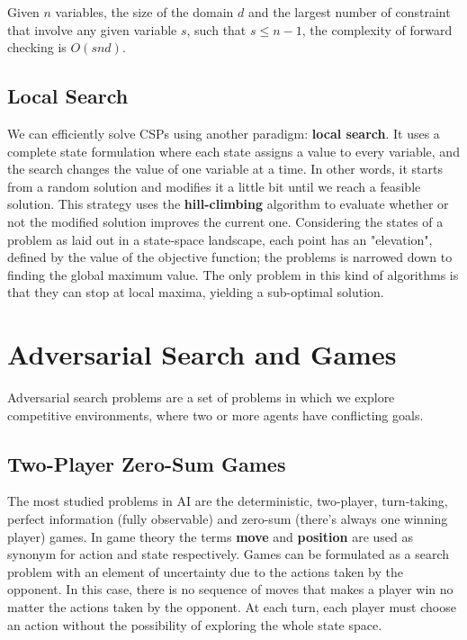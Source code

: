 \documentclass{article}
\begin{document}
Given $n$ variables, the size of the domain $d$ and the largest number of constraint that involve any given variable $s$, such that $s\le n-1$, the complexity of forward checking is $O(snd)$.

\subsection{Local Search}
We can efficiently solve CSPs using another paradigm: \textbf{local search}. It uses a complete state formulation where each state assigns a value to every variable, and the search changes the value of one variable at a time. In other words, it starts from a random solution and modifies it a little bit until we reach a feasible solution. This strategy uses the \textbf{hill-climbing} algorithm to evaluate whether or not the modified solution improves the current one. Considering the states of a problem as laid out in a state-space landscape, each point has an "elevation", defined by the value of the objective function; the problems is narrowed down to finding the global maximum value. The only problem in this kind of algorithms is that they can stop at local maxima, yielding a sub-optimal solution.



\clearpage
\section{Adversarial Search and Games}
Adversarial search problems are a set of problems in which we explore competitive environments, where two or more agents have conflicting goals.

\subsection{Two-Player Zero-Sum Games}
The most studied problems in AI are the deterministic, two-player, turn-taking, perfect information (fully observable) and zero-sum (there's always one winning player) games. In game theory the terms \textbf{move} and \textbf{position} are used as synonym for action and state respectively. Games can be formulated as a search problem with an element of uncertainty due to the actions taken by the opponent. In this case, there is no sequence of moves that makes a player win no matter the actions taken by the opponent. At each turn, each player must choose an action without the possibility of exploring the whole state space.
\end{document}
